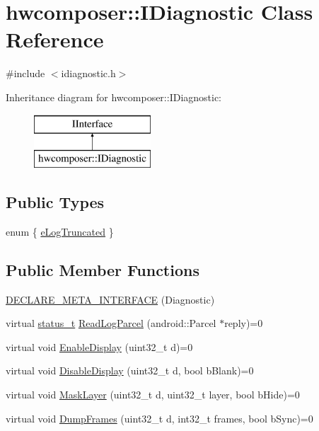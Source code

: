 \hypertarget{classhwcomposer_1_1IDiagnostic}{}\section{hwcomposer\+:\+:I\+Diagnostic Class Reference}
\label{classhwcomposer_1_1IDiagnostic}


{\ttfamily \#include $<$idiagnostic.\+h$>$}

Inheritance diagram for hwcomposer\+:\+:I\+Diagnostic\+:\begin{figure}[H]
\begin{center}
\leavevmode
\includegraphics[height=2.000000cm]{classhwcomposer_1_1IDiagnostic}
\end{center}
\end{figure}
\subsection*{Public Types}
\begin{DoxyCompactItemize}
\item 
enum \{ \mbox{\hyperlink{classhwcomposer_1_1IDiagnostic_a56d1a1e037a9dfa35652205e24362776a58f5959ce571ee0e01c774fad36118b6}{e\+Log\+Truncated}}
 \}
\end{DoxyCompactItemize}
\subsection*{Public Member Functions}
\begin{DoxyCompactItemize}
\item 
\mbox{\hyperlink{classhwcomposer_1_1IDiagnostic_a9993955822071212ea5ccbc9e85987d2}{D\+E\+C\+L\+A\+R\+E\+\_\+\+M\+E\+T\+A\+\_\+\+I\+N\+T\+E\+R\+F\+A\+CE}} (Diagnostic)
\item 
virtual \mbox{\hyperlink{hwcserviceapi_8h_a3806fb2027d9a316d8ca8d9b8b8eb96f}{status\+\_\+t}} \mbox{\hyperlink{classhwcomposer_1_1IDiagnostic_ade22f6b73a1912c02dec2a2baaa14a4a}{Read\+Log\+Parcel}} (android\+::\+Parcel $\ast$reply)=0
\item 
virtual void \mbox{\hyperlink{classhwcomposer_1_1IDiagnostic_a56f95024619fc80d9f022462392818e3}{Enable\+Display}} (uint32\+\_\+t d)=0
\item 
virtual void \mbox{\hyperlink{classhwcomposer_1_1IDiagnostic_ad5ea1c34401b325c6d795f9417c2cd89}{Disable\+Display}} (uint32\+\_\+t d, bool b\+Blank)=0
\item 
virtual void \mbox{\hyperlink{classhwcomposer_1_1IDiagnostic_aadfea7c0adee73575567a580105f841e}{Mask\+Layer}} (uint32\+\_\+t d, uint32\+\_\+t layer, bool b\+Hide)=0
\item 
virtual void \mbox{\hyperlink{classhwcomposer_1_1IDiagnostic_ad3e81bebcbc3bf7dac6431eb50a33304}{Dump\+Frames}} (uint32\+\_\+t d, int32\+\_\+t frames, bool b\+Sync)=0
\end{DoxyCompactItemize}


